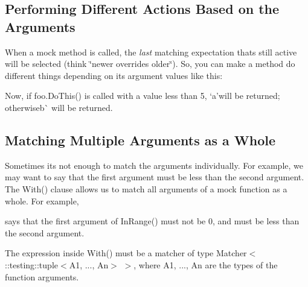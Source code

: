 \subsection*{Performing Different Actions Based on the Arguments}

When a mock method is called, the {\itshape last} matching expectation that\textquotesingle{}s still active will be selected (think \char`\"{}newer overrides older\char`\"{}). So, you can make a method do different things depending on its argument values like this\+:


\begin{DoxyCode}{0}
\DoxyCodeLine{}
\end{DoxyCode}


Now, if {\ttfamily foo.\+Do\+This()} is called with a value less than 5, `\textquotesingle{}a'{\ttfamily will be returned; otherwise}\textquotesingle{}b\textquotesingle{}\`{} will be returned.

\subsection*{Matching Multiple Arguments as a Whole}

Sometimes it\textquotesingle{}s not enough to match the arguments individually. For example, we may want to say that the first argument must be less than the second argument. The {\ttfamily With()} clause allows us to match all arguments of a mock function as a whole. For example,


\begin{DoxyCode}{0}
\end{DoxyCode}


says that the first argument of {\ttfamily In\+Range()} must not be 0, and must be less than the second argument.

The expression inside {\ttfamily With()} must be a matcher of type {\ttfamily Matcher$<$ \+::testing\+::tuple$<$A1, ..., An$>$ $>$}, where {\ttfamily A1}, ..., {\ttfamily An} are the types of the function arguments.

